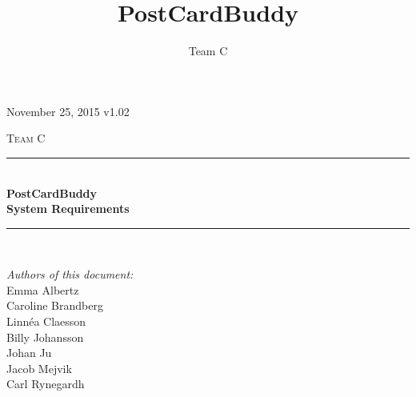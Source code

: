 \documentclass[10pt,a4paper]{article}
\title{PostCardBuddy}
\author{Team C}
\begin{document}
\begin{titlepage}
\newcommand{\HRule}{\rule{\linewidth}{0.5mm}}


\begin{flushright}
November 25, 2015 v1.02\\[3cm]
\end{flushright}


\centering
\textsc{\LARGE Team C}\\[0.5cm]

\HRule \\[0.4cm]
{ \huge \bfseries PostCardBuddy}\\[0.3cm]
{\Large \bfseries System Requirements}\\[0.4cm] %
\HRule \\[1.5cm]

\vfill
\begin{flushleft}
\textit{Authors of this document:}\\
Emma Albertz\\
Caroline Brandberg\\
Linnéa Claesson\\
Billy Johansson\\
Johan Ju\\
Jacob Mejvik\\
Carl Rynegardh
\end{flushleft}

\end{titlepage}



%



\setcounter{tocdepth}{2}
\tableofcontents
\newpage
{}

\end{document}
